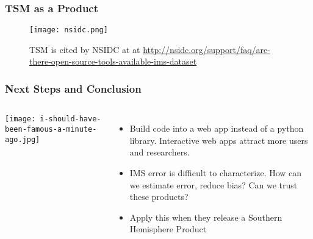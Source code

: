 \begin{frame}
\frametitle{TSM as a Product}
\begin{figure}
\vspace*{-1cm}
\centering
\begin{minipage}{1\columnwidth}
\texttt{[image: nsidc.png]}
\caption{TSM is cited by NSIDC at at \url{http://nsidc.org/support/faq/are-there-open-source-tools-available-ims-dataset}}
\end{minipage}
\end{figure}
\end{frame}

\begin{frame}
\frametitle{Next Steps and Conclusion}
\begin{columns}
\texttt{[image: i-should-have-been-famous-a-minute-ago.jpg]}
\begin{itemize}
    \item Build code into a web app instead of a python library. Interactive web apps attract more users and researchers.
    \item IMS error is difficult to characterize. How can we estimate error, reduce bias? Can we trust these products?
    \item Apply this when they release a Southern Hemisphere Product
\end{itemize}
\end{columns}
\end{frame}